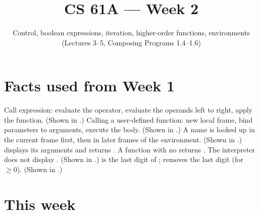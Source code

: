 \documentclass[10pt]{scrartcl}
\title{CS 61A --- Week 2}
\subtitle{Control, boolean expressions, iteration, higher-order functions, environments (Lectures 3--5, Composing Programs 1.4--1.6)}
\author{}\date{}\ihead{}
\begin{document}
\maketitle

\section{Facts used from Week 1}
\begin{enumerate}[label=(W\arabic*),leftmargin=2.8em,itemsep=4pt]
  \ii {}Call expression: evaluate the operator, evaluate the operands left to right, apply the function. (Shown in .)
  \ii {}Calling a user-defined function: new local frame, bind parameters to arguments, execute the body. (Shown in .)
  \ii {}A name is looked up in the current frame first, then in later frames of the environment. (Shown in .)
  \ii {} displays its arguments and returns . A function with no  returns . The interpreter does not display . (Shown in .)
  \ii {} is the last digit of ;  removes the last digit (for  $\ge 0$). (Shown in .)
\end{enumerate}

\section{This week}
\end{document}

